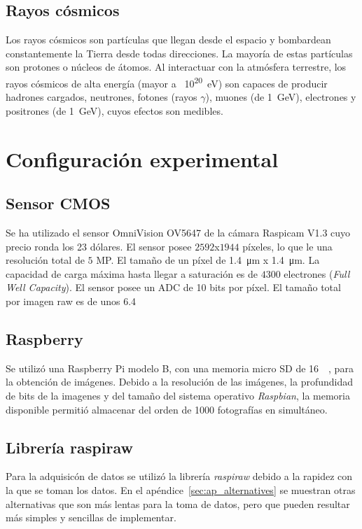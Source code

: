 \documentclass[twoside,twocolumn]{article}
\begin{document}
    \subsection{Rayos cósmicos}\label{sec:intro:cosmic_ray}
      Los rayos cósmicos son partículas que llegan desde el espacio y bombardean constantemente la Tierra desde todas direcciones.
      La mayoría de estas partículas son protones o núcleos de átomos.
      Al interactuar con la atmósfera terrestre, los rayos cósmicos de alta energía (mayor a \SI{}{10^{20}\eV})
      son capaces de producir hadrones cargados, neutrones, fotones (rayos $\gamma$),
      muones (de \SI{1}{\giga \eV}), electrones y positrones (de \SI{1}{\giga \eV}), \cite{GriederCRAE}
      cuyos efectos son medibles.
  

  \section{Configuración experimental}\label{sec:conf_exp}

    \subsection{Sensor CMOS}\label{sec:conf_exp:CMOS}
      Se ha utilizado el sensor OmniVision OV5647 de la cámara Raspicam V1.3 cuyo precio ronda los 23 dólares.
      El sensor posee	$2592$x$1944$ píxeles, lo que le una resolución total de $5$ MP.
      El tamaño de un píxel de \SI{1.4}{\micro\meter} x \SI{1.4}{\micro\meter}.
      La capacidad de carga máxima hasta llegar a saturación es de $4300$ electrones (\emph{Full Well Capacity}).
      El sensor posee un ADC de 10 bits por píxel.
      El tamaño total por imagen raw es de unos \SI{6.4}{\mega\byte}

    \subsection{Raspberry}\label{sec:conf_exp:raspberry}
      Se utilizó una Raspberry Pi modelo B, con una memoria micro SD de \SI{16}{\giga\byte}, para la obtención de imágenes.
      Debido a la resolución de las imágenes, la profundidad de bits de la imagenes y del tamaño del sistema operativo \emph{Raspbian}, 
      la memoria disponible permitió almacenar del orden de 1000 fotografías en simultáneo.

    \subsection{Librería raspiraw}\label{sec:conf_exp:raspiraw}
      Para la adquisicón de datos se utilizó la librería {\it raspiraw}\cite{raspiraw} debido a la rapidez con la que se toman los datos.
      En el apéndice~\ref{sec:ap_alternatives} se muestran otras alternativas que son más lentas para la toma de datos,
      pero que pueden resultar más simples y sencillas de implementar.
\end{document}
